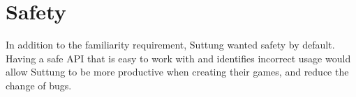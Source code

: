 \section{Safety}
In addition to the familiarity requirement, Suttung wanted safety by default.
Having a safe API that is easy to work with and identifies incorrect usage would allow Suttung to be more productive when creating their games,
and reduce the change of bugs.

